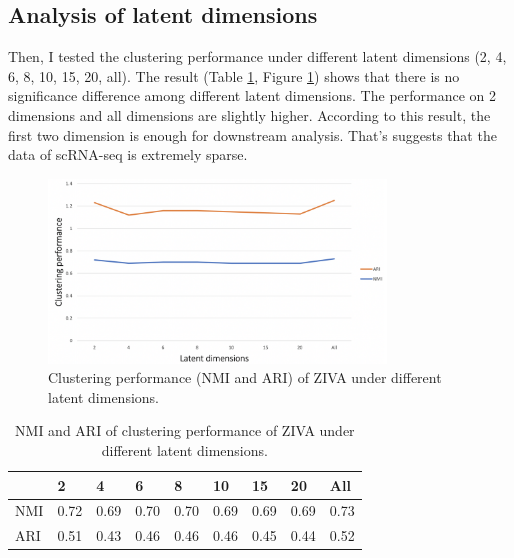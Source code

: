 \subsection{Analysis of latent dimensions}
Then, I tested the clustering performance under different latent dimensions (2, 4, 6, 8, 10, 15, 20, all). The result (Table \ref{dimt}, Figure \ref{dim}) shows that there is no significance difference among different latent dimensions. The performance on 2 dimensions and all dimensions are slightly higher. According to this result, the first two dimension is enough for downstream analysis. That's suggests that the data of scRNA-seq is extremely sparse.
\begin{figure}[htb!]
    \centering
    \includegraphics[width=0.8\textwidth]{figures/myfigures/dim.png}
    \caption{Clustering performance (NMI and ARI) of ZIVA under different latent dimensions.}
    \label{dim}
\end{figure}

\begin{table}[htb!]
\centering
\caption{NMI and ARI of clustering performance of ZIVA under different latent dimensions.}
\label{dimt}
\begin{tabular}{lllllllll}
\hline
    & 2    & 4    & 6    & 8    & 10   & 15   & 20   & All  \\ \hline
NMI & 0.72 & 0.69 & 0.70 & 0.70 & 0.69 & 0.69 & 0.69 & 0.73 \\
ARI & 0.51 & 0.43 & 0.46 & 0.46 & 0.46 & 0.45 & 0.44 & 0.52 \\ \hline
\end{tabular}
\end{table}